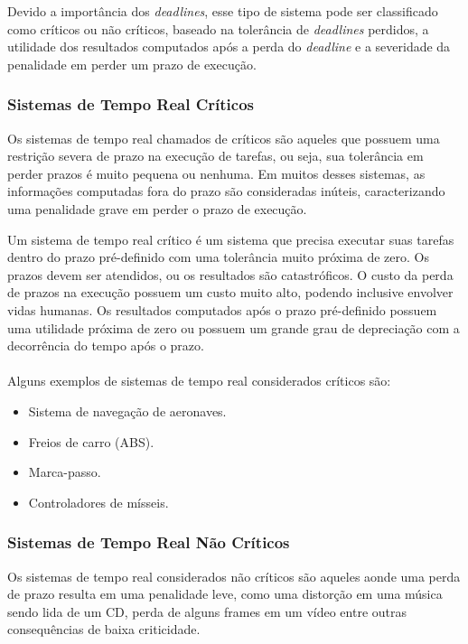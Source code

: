 Devido a importância dos \textit{deadlines}, esse tipo de sistema pode ser classificado como
críticos ou não críticos, baseado na tolerância de \textit{deadlines} perdidos, a utilidade
dos resultados computados após a perda do \textit{deadline} e a severidade da penalidade em
perder um prazo de execução.

\subsubsection{Sistemas de Tempo Real Críticos}
Os sistemas de tempo real chamados de críticos são aqueles que possuem uma restrição severa
de prazo na execução de tarefas, ou seja, sua tolerância em perder prazos é muito pequena
ou nenhuma. Em muitos desses sistemas, as informações computadas fora do prazo são consideradas
inúteis, caracterizando uma penalidade grave em perder o prazo de execução.

Um sistema de tempo real crítico é um sistema que precisa executar suas tarefas dentro do prazo
pré-definido com uma tolerância muito próxima de zero. Os prazos devem ser atendidos, ou os resultados
são catastróficos. O custo da perda de prazos na execução possuem um custo muito alto, podendo inclusive
envolver vidas humanas. Os resultados computados após o prazo pré-definido possuem uma utilidade próxima
de zero ou possuem um grande grau de depreciação com a decorrência do tempo após o prazo.~\cite{Li:2003:RCE:829584} \\\\
Alguns exemplos de sistemas de tempo real considerados críticos são:
\begin{itemize}
\item Sistema de navegação de aeronaves.
\item Freios de carro (ABS).
\item Marca-passo.
\item Controladores de mísseis.
\end{itemize}

\subsubsection{Sistemas de Tempo Real Não Críticos}
Os sistemas de tempo real considerados não críticos são aqueles aonde uma perda de prazo
resulta em uma penalidade leve, como uma distorção em uma música sendo lida de um CD, perda
de alguns frames em um vídeo entre outras consequências de baixa criticidade.

